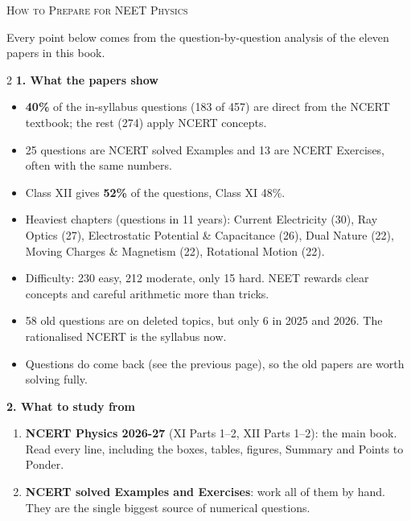 \clearpage
\begin{center}{}\par
{\fontsize{20}{24}\selectfont\color{navy}\scshape How to Prepare for NEET Physics}\par
{\color{gilt}}\end{center}\label{pplan}
\vspace{2pt}
{\small Every point below comes from the question-by-question analysis of the eleven papers in this book.}\par\medskip
\begin{multicols}{2}
\textbf{\color{crimson}1. What the papers show}\par\smallskip
\begin{itemize}[leftmargin=1.1em,itemsep=2pt,topsep=0pt]
\item \textbf{40\%} of the in-syllabus questions (183 of 457) are direct from the NCERT textbook; the rest (274) apply NCERT concepts.
\item 25 questions are NCERT solved Examples and 13 are NCERT Exercises, often with the same numbers.
\item Class XII gives \textbf{52\%} of the questions, Class XI 48\%.
\item Heaviest chapters (questions in 11 years): Current Electricity (30), Ray Optics (27), Electrostatic Potential \& Capacitance (26), Dual Nature (22), Moving Charges \& Magnetism (22), Rotational Motion (22).
\item Difficulty: 230 easy, 212 moderate, only 15 hard. NEET rewards clear concepts and careful arithmetic more than tricks.
\item 58 old questions are on deleted topics, but only 6 in 2025 and 2026. The rationalised NCERT is the syllabus now.
\item Questions do come back (see the previous page), so the old papers are worth solving fully.
\end{itemize}\medskip
\textbf{\color{crimson}2. What to study from}\par\smallskip
\begin{enumerate}[leftmargin=1.3em,itemsep=2pt,topsep=0pt]
\item \textbf{NCERT Physics 2026-27} (XI Parts 1--2, XII Parts 1--2): the main book. Read every line, including the boxes, tables, figures, Summary and Points to Ponder.
\item \textbf{NCERT solved Examples and Exercises}: work all of them by hand. They are the single biggest source of numerical questions.

\end{enumerate}
\end{multicols}
